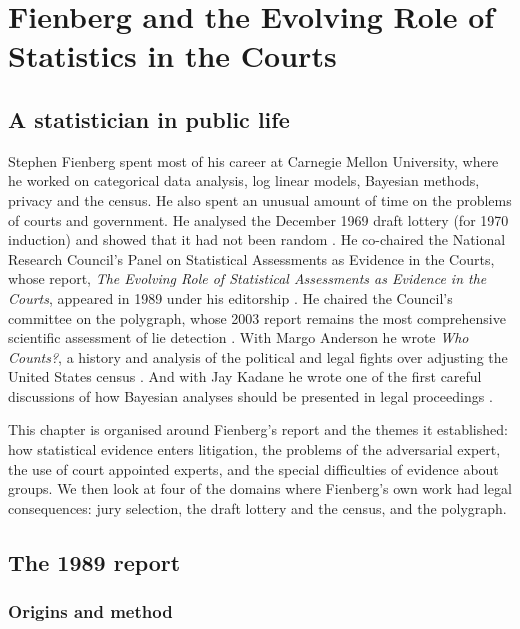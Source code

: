 \chapter{Fienberg and the Evolving Role of Statistics in the Courts}
\label{ch:fienberg}

\section{A statistician in public life}

Stephen Fienberg spent most of his career at Carnegie Mellon University, where he worked on categorical data analysis, log linear models, Bayesian methods, privacy and the census. He also spent an unusual amount of time on the problems of courts and government. He analysed the December 1969 draft lottery (for 1970 induction) and showed that it had not been random \citep{fienberg1971}. He co-chaired the National Research Council's Panel on Statistical Assessments as Evidence in the Courts, whose report, \emph{The Evolving Role of Statistical Assessments as Evidence in the Courts}, appeared in 1989 under his editorship \citep{fienberg1989}. He chaired the Council's committee on the polygraph, whose 2003 report remains the most comprehensive scientific assessment of lie detection \citep{nrc2003}. With Margo Anderson he wrote \emph{Who Counts?}, a history and analysis of the political and legal fights over adjusting the United States census \citep{anderson1999}. And with Jay Kadane he wrote one of the first careful discussions of how Bayesian analyses should be presented in legal proceedings \citep{fienberg_kadane1983}.

This chapter is organised around Fienberg's report and the themes it established: how statistical evidence enters litigation, the problems of the adversarial expert, the use of court appointed experts, and the special difficulties of evidence about groups. We then look at four of the domains where Fienberg's own work had legal consequences: jury selection, the draft lottery and the census, and the polygraph.

\section{The 1989 report}

\subsection{Origins and method}

